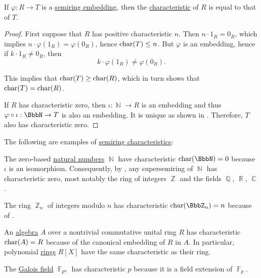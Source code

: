 \begin{proposition}\label{thm:semiring_embedding_preserves_characterstic}
  If \( \varphi: R \to T \) is a \hyperref[def:semiring/homomorphism]{semiring embedding}, then the \hyperref[def:semiring_characteristic]{characteristic} of \( R \) is equal to that of \( T \).
\end{proposition}
\begin{proof}
  First suppose that \( R \) has positive characteristic \( n \). Then \( n \cdot 1_R = 0_R \), which implies \( n \cdot \varphi(1_R) = \varphi(0_R) \), hence \( \operatorname{char}(T) \leq n \). But \( \varphi \) is an embedding, hence if \( k \cdot 1_R \neq 0_R \), then
  \begin{equation*}
    k \cdot \varphi(1_R) \neq \varphi(0_R).
  \end{equation*}

  This implies that \( \operatorname{char}(T) \geq \operatorname{char}(R) \), which in turn shows that \( \operatorname{char}(T) = \operatorname{char}(R) \).

  If \( R \) has characteristic zero, then \( \iota: \BbbN \to R \) is an embedding and thus \( \varphi \bincirc \iota: \BbbN \to T \) is also an embedding. It is unique as shown in . Therefore, \( T \) also has characteristic zero.
\end{proof}

\begin{example}\label{ex:semiring_characteristic}
  The following are examples of \hyperref[def:semiring_characteristic]{semiring characteristics}:

  \begin{thmenum}
     The zero-based \hyperref[def:set_of_natural_numbers]{natural numbers} \( \BbbN \) have characteristic \( \op{char}(\BbbN) = 0 \) because \( \iota \) is an isomorphism. Consequently, by , any supersemiring of \( \BbbN \) has characteristic zero, most notably the ring of integers \( \BbbZ \) and the fields \( \BbbQ \), \( \BbbR \), \( \BbbC \).

     The ring \hyperref[def:ring_of_integers_modulo]{\( \BbbZ_n \)} of integers modulo \( n \) has characteristic \( \op{char}(\BbbZ_n) = n \) because of .

     An \hyperref[def:algebra_over_ring]{algebra} \( A \) over a nontrivial commutative unital ring \( R \) has characteristic \( \operatorname{char}(A) = R \) because of the canonical embedding of \( R \) in \( A \). In particular, polynomial \hyperref[def:algebra_of_polynomials]{rings} \( R[X] \) have the same characteristic as their ring.

     The \hyperref[thm:galois_field_existence]{Galois field} \( \BbbF_{p^n} \) has characteristic \( p \) because it is a field extension of \( \BbbF_p \).
  \end{thmenum}
\end{example}

